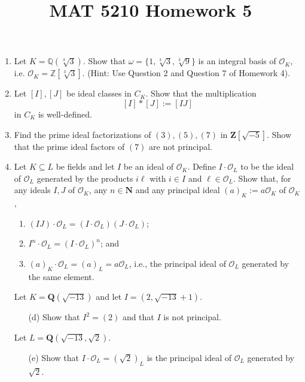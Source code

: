 \documentclass{article}
\title{MAT 5210 Homework 5}
\author{}
\date{}
\begin{document}
\maketitle

\begin{enumerate}
    \item Let $K=\mathbb{Q}(\sqrt[3]{3})$. Show that $\omega=\{1,\sqrt[3]{3},\sqrt[3]{9}\}$ is an integral basis of $\mathcal{O}_K$, i.e. $\mathcal{O}_K=\mathbb{Z}[\sqrt[3]{3}]$. (Hint: Use Question 2 and Question 7 of Homework 4).


    \item Let $[I], [J]$ be ideal classes in $C_K$. Show that the multiplication
    \[
    [I] * [J] := [IJ]
    \]
    in $C_K$ is well-defined.

    \item Find the prime ideal factorizations of $(3), (5), (7)$ in $\mathbf{Z}[\sqrt{-5}]$. Show that the prime ideal factors of $(7)$ are not principal.

    \item Let $K \subseteq L$ be fields and let $I$ be an ideal of $\mathcal{O}_K$. Define $I \cdot \mathcal{O}_L$ to be the ideal of $\mathcal{O}_L$ generated by the products $i\ell$ with $i \in I$ and $\ell \in \mathcal{O}_L$. Show that, for any ideals $I, J$ of $\mathcal{O}_K$, any $n \in \mathbf{N}$ and any principal ideal $(a)_K := a\mathcal{O}_K$ of $\mathcal{O}_K$,
    \begin{enumerate}
        \item $(IJ) \cdot \mathcal{O}_L = (I \cdot \mathcal{O}_L)(J \cdot \mathcal{O}_L)$;
        \item $I^n \cdot \mathcal{O}_L = (I \cdot \mathcal{O}_L)^n$; and
        \item $(a)_K \cdot \mathcal{O}_L = (a)_L = a\mathcal{O}_L$, i.e., the principal ideal of $\mathcal{O}_L$ generated by the same element.
    \end{enumerate}

    Let $K = \mathbf{Q}(\sqrt{-13})$ and let $I = (2, \sqrt{-13} + 1)$.
    \begin{enumerate}
        \item[(d)] Show that $I^2 = (2)$ and that $I$ is not principal.
    \end{enumerate}

    Let $L = \mathbf{Q}(\sqrt{-13}, \sqrt{2})$.
    \begin{enumerate}
        \item[(e)] Show that $I \cdot \mathcal{O}_L = (\sqrt{2})_L$ is the principal ideal of $\mathcal{O}_L$ generated by $\sqrt{2}$.
    \end{enumerate}


\end{enumerate}
\end{document}
